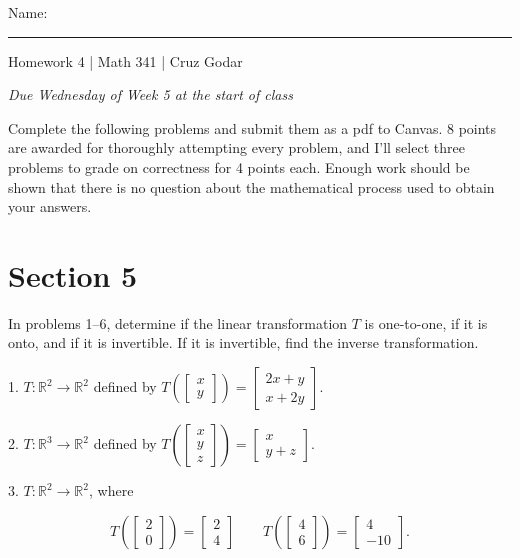 \documentclass{article}
\begin{document}
\Large Name: \rule{2in}{0.15mm} \hfill Homework 4 | Math 341 | Cruz Godar \vspace{4pt}  \normalsize

\textit{Due Wednesday of Week 5 at the start of class}

Complete the following problems and submit them as a pdf to Canvas. 8 points are awarded for thoroughly attempting every problem, and I'll select three problems to grade on correctness for 4 points each. Enough work should be shown that there is no question about the mathematical process used to obtain your answers.

\section{Section 5}

In problems 1--6, determine if the linear transformation $T$ is one-to-one, if it is onto, and if it is invertible. If it is invertible, find the inverse transformation.

1. $T: \mathbb{R}^2 \to \mathbb{R}^2$ defined by $T\left(\left[\begin{array}{c} x \\ y \end{array}\right]\right) = \left[\begin{array}{c} 2x + y \\ x + 2y\end{array}\right]$.

2. $T: \mathbb{R}^3 \to \mathbb{R}^2$ defined by $T\left(\left[\begin{array}{c} x \\ y \\ z \end{array}\right]\right) = \left[\begin{array}{c} x \\ y + z \end{array}\right]$.

3. $T: \mathbb{R}^2 \to \mathbb{R}^2$, where

$$
	T\left(\left[\begin{array}{c} 2 \\ 0 \end{array}\right]\right) = \left[\begin{array}{c} 2 \\ 4 \end{array}\right] \qquad T\left(\left[\begin{array}{c} 4 \\ 6 \end{array}\right]\right) = \left[\begin{array}{c} 4 \\ -10 \end{array}\right].
$$
\end{document}

